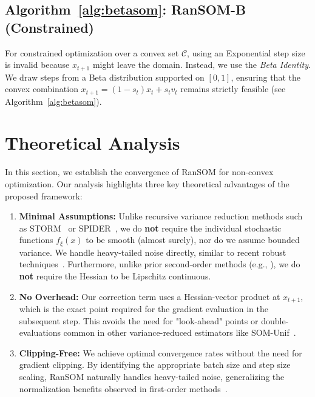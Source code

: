 \documentclass{article}
\theoremstyle{plain}
\theoremstyle{definition}
\theoremstyle{remark}
\begin{document}
\subsection{Algorithm~\ref{alg:betasom}: RanSOM-B (Constrained)}
For constrained optimization over a convex set $\mathcal{C}$, using an Exponential step size is invalid because $x_{t+1}$ might leave the domain. Instead, we use the \textit{Beta Identity}. We draw steps from a Beta distribution supported on $[0, 1]$, ensuring that the convex combination $x_{t+1} = (1-s_t)x_t + s_t v_t$ remains strictly feasible (see Algorithm~\ref{alg:betasom}).


\section{Theoretical Analysis}
\label{sec:theory}

In this section, we establish the convergence of RanSOM for non-convex optimization. Our analysis highlights three key theoretical advantages of the proposed framework:

\begin{enumerate}
    \item \textbf{Minimal Assumptions:} Unlike recursive variance reduction methods such as STORM~\cite{cutkosky2019storm} or SPIDER~\cite{fang2018spider}, we do \textbf{not} require the individual stochastic functions $f_\xi(x)$ to be smooth (almost surely), nor do we assume bounded variance. We handle heavy-tailed noise directly, similar to recent robust techniques~\cite{liu2023nonconvex, hubler2025gradient}. Furthermore, unlike prior second-order methods (e.g., \cite{tran2022better, khirirat2025better}), we do \textbf{not} require the Hessian to be Lipschitz continuous.
    
    \item \textbf{No Overhead:} Our correction term uses a Hessian-vector product at $x_{t+1}$, which is the exact point required for the gradient evaluation in the subsequent step. This avoids the need for "look-ahead" points or double-evaluations common in other variance-reduced estimators like SOM-Unif~\cite{salehkaleybar2022momentum, zhang2020one}.
    
    \item \textbf{Clipping-Free:} We achieve optimal convergence rates without the need for gradient clipping. By identifying the appropriate batch size and step size scaling, RanSOM naturally handles heavy-tailed noise, generalizing the normalization benefits observed in first-order methods~\cite{hubler2025gradient}.
\end{enumerate}
\end{document}
